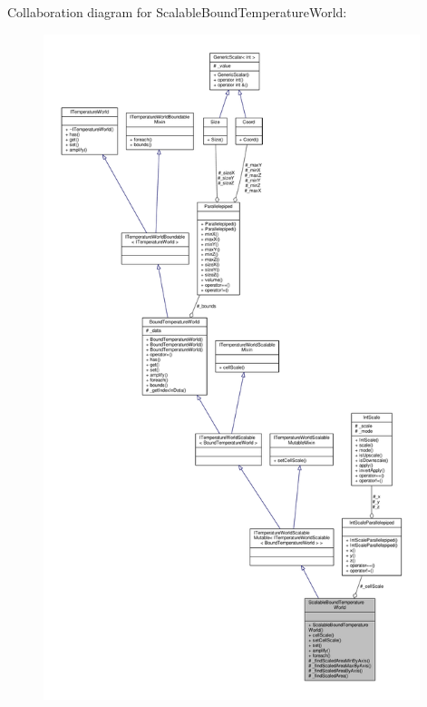 Collaboration diagram for Scalable\-Bound\-Temperature\-World\-:
\nopagebreak
\begin{figure}[H]
\begin{center}
\leavevmode
\includegraphics[height=550pt]{class_scalable_bound_temperature_world__coll__graph}
\end{center}
\end{figure}
